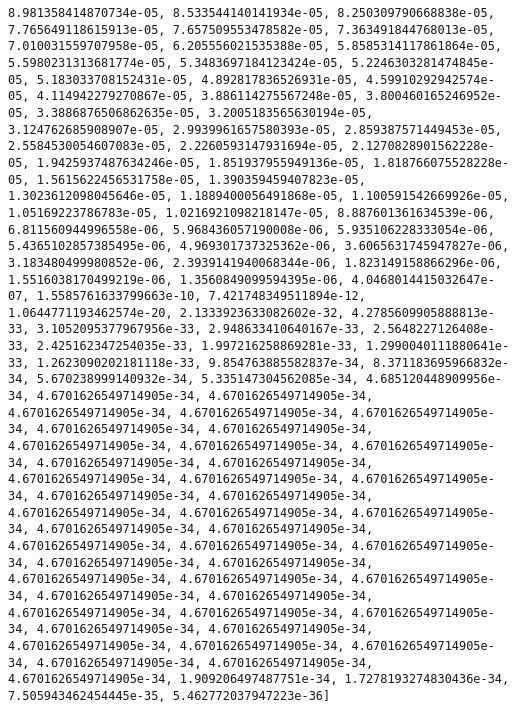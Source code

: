 \documentclass[11pt]{article}
\begin{document}
\begin{Verbatim}[commandchars=\\\{\}]
8.981358414870734e-05, 8.533544140141934e-05, 8.250309790668838e-05, 7.765649118615913e-05, 7.657509553478582e-05, 7.363491844768013e-05, 7.010031559707958e-05, 6.205556021535388e-05, 5.8585314117861864e-05, 5.5980231313681774e-05, 5.3483697184123424e-05, 5.2246303281474845e-05, 5.183033708152431e-05, 4.892817836526931e-05, 4.59910292942574e-05, 4.114942279270867e-05, 3.886114275567248e-05, 3.800460165246952e-05, 3.3886876506862635e-05, 3.2005183565630194e-05, 3.124762685908907e-05, 2.9939961657580393e-05, 2.859387571449453e-05, 2.5584530054607083e-05, 2.2260593147931694e-05, 2.1270828901562228e-05, 1.9425937487634246e-05, 1.851937955949136e-05, 1.818766075528228e-05, 1.5615622456531758e-05, 1.390359459407823e-05, 1.3023612098045646e-05, 1.1889400056491868e-05, 1.100591542669926e-05, 1.05169223786783e-05, 1.0216921098218147e-05, 8.887601361634539e-06, 6.811560944996558e-06, 5.968436057190008e-06, 5.935106228333054e-06, 5.4365102857385495e-06, 4.969301737325362e-06, 3.6065631745947827e-06, 3.183480499980852e-06, 2.3939141940068344e-06, 1.823149158866296e-06, 1.5516038170499219e-06, 1.3560849099594395e-06, 4.0468014415032647e-07, 1.5585761633799663e-10, 7.421748349511894e-12, 1.0644771193462574e-20, 2.1333923633082602e-32, 4.2785609905888813e-33, 3.1052095377967956e-33, 2.948633410640167e-33, 2.5648227126408e-33, 2.425162347254035e-33, 1.997216258869281e-33, 1.2990040111880641e-33, 1.2623090202181118e-33, 9.854763885582837e-34, 8.371183695966832e-34, 5.670238999140932e-34, 5.335147304562085e-34, 4.685120448909956e-34, 4.6701626549714905e-34, 4.6701626549714905e-34, 4.6701626549714905e-34, 4.6701626549714905e-34, 4.6701626549714905e-34, 4.6701626549714905e-34, 4.6701626549714905e-34, 4.6701626549714905e-34, 4.6701626549714905e-34, 4.6701626549714905e-34, 4.6701626549714905e-34, 4.6701626549714905e-34, 4.6701626549714905e-34, 4.6701626549714905e-34, 4.6701626549714905e-34, 4.6701626549714905e-34, 4.6701626549714905e-34, 4.6701626549714905e-34, 4.6701626549714905e-34, 4.6701626549714905e-34, 4.6701626549714905e-34, 4.6701626549714905e-34, 4.6701626549714905e-34, 4.6701626549714905e-34, 4.6701626549714905e-34, 4.6701626549714905e-34, 4.6701626549714905e-34, 4.6701626549714905e-34, 4.6701626549714905e-34, 4.6701626549714905e-34, 4.6701626549714905e-34, 4.6701626549714905e-34, 4.6701626549714905e-34, 4.6701626549714905e-34, 4.6701626549714905e-34, 4.6701626549714905e-34, 4.6701626549714905e-34, 4.6701626549714905e-34, 4.6701626549714905e-34, 4.6701626549714905e-34, 4.6701626549714905e-34, 4.6701626549714905e-34, 4.6701626549714905e-34, 1.909206497487751e-34, 1.7278193274830436e-34, 7.505943462454445e-35, 5.462772037947223e-36]

    \end{Verbatim}
\end{document}
